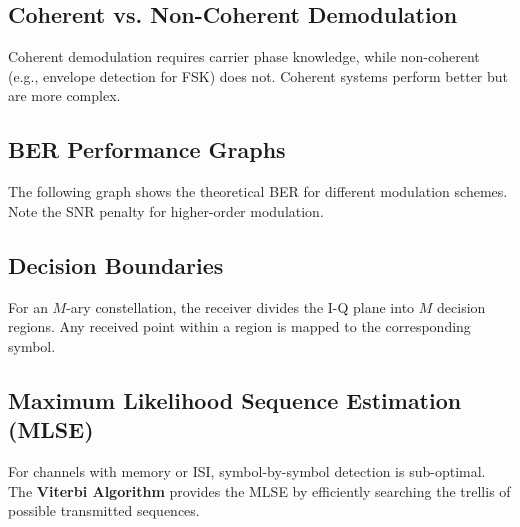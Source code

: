 \subsection{Coherent vs. Non-Coherent Demodulation}
Coherent demodulation requires carrier phase knowledge, while non-coherent (e.g., envelope detection for FSK) does not. Coherent systems perform better but are more complex.

\subsection{BER Performance Graphs}
The following graph shows the theoretical BER for different modulation schemes. Note the SNR penalty for higher-order modulation.

\begin{center}
\end{center}

\subsection{Decision Boundaries}
For an $M$-ary constellation, the receiver divides the I-Q plane into $M$ decision regions. Any received point within a region is mapped to the corresponding symbol.

\subsection{Maximum Likelihood Sequence Estimation (MLSE)}
For channels with memory or ISI, symbol-by-symbol detection is sub-optimal. The \textbf{Viterbi Algorithm} provides the MLSE by efficiently searching the trellis of possible transmitted sequences.


